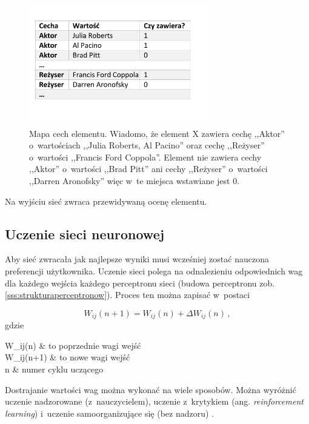 \documentclass[twoside]{iisthesis}
\begin{document}
		 \begin{figure}%
		 	\centering
		 	\includegraphics[width=0.7\textwidth]{mapacech}
		 	\caption{Mapa cech elementu. Wiadomo, że element X zawiera cechę ,,Aktor'' o~wartościach ,,Julia Roberts, Al Pacino'' oraz cechę ,,Reżyser'' o~wartości ,,Francis Ford Coppola''. Element nie zawiera cechy ,,Aktor'' o~wartości ,,Brad Pitt'' ani cechy ,,Reżyser'' o~wartości ,,Darren Aronofsky'' więc w~te miejsca wstawiane jest $0$.}
		 	\label{fig:mapacech}
		 \end{figure}
		 
		 Na wyjściu sieć zwraca przewidywaną ocenę elementu.
		 		 
		 
	 \subsection{Uczenie sieci neuronowej}
		 \label{ss:uczeniesiecineuronowej}
		 
		 Aby sieć zwracała jak najlepsze wyniki musi wcześniej zostać nauczona preferencji użytkownika. Uczenie sieci polega na odnalezieniu odpowiednich wag dla każdego wejścia każdego perceptronu sieci (budowa perceptronu zob. \ref{sss:strukturaperceptronow}). Proces ten można zapisać w~postaci
		 
		 \begin{equation}
		 \label{eq:weightadaptation}
		 W_{ij}(n+1) = W_{ij}(n) + \Delta W_{ij}(n) 
		 \,,
		 \end{equation}		 		 
		 gdzie
		 
		 \begin{conditions*}
		 	W_{ij}(n) & to poprzednie wagi wejść \\
		 	W_{ij}(n+1) & to nowe wagi wejść \\
		 	n & numer cyklu uczącego 
		 \end{conditions*} 
		 
		 Dostrajanie wartości wag można wykonać na wiele sposobów. Można wyróżnić uczenie nadzorowane (z~nauczycielem), uczenie z~krytykiem (ang. \textit{reinforcement learning}) i~uczenie samoorganizujące się (bez nadzoru) \cite{osowski1996sieci}.
		 
\end{document}
